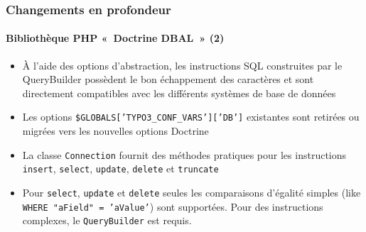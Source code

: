 \begin{frame}[fragile]
	\frametitle{Changements en profondeur}
	\framesubtitle{Bibliothèque PHP «~Doctrine DBAL~» (2)}

	\begin{itemize}

		\item À l'aide des options d'abstraction, les instructions SQL construites
			par le QueryBuilder possèdent le bon échappement des caractères et sont
			directement compatibles avec les différents systèmes de base de données

		\item Les options \texttt{\$GLOBALS['TYPO3\_CONF\_VARS']['DB']} existantes sont
			retirées ou migrées vers les nouvelles options Doctrine

		\item La classe \texttt{Connection} fournit des méthodes pratiques pour les
			instructions \texttt{insert}, \texttt{select}, \texttt{update}, \texttt{delete}
			et \texttt{truncate}

		\item Pour \texttt{select}, \texttt{update} et \texttt{delete} seules les
		 	comparaisons d'égalité simples (like \texttt{WHERE "aField" = 'aValue'}) sont supportées.
			Pour des instructions complexes, le \texttt{QueryBuilder} est requis.

	\end{itemize}

\end{frame}

